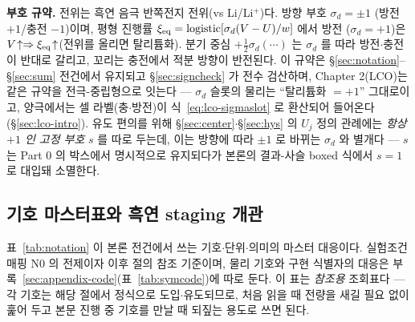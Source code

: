 \textbf{부호 규약.} 전위는 흑연 음극 반쪽전지 전위(vs Li/Li$^+$)다. 방향 부호 $\sigma_d=\pm1$
(방전 $+1$/충전 $-1$)이며, 평형 진행률 $\xi_{\mathrm{eq}}=\mathrm{logistic}[\sigma_d(V-U)/w]$ 에서 방전
($\sigma_d=+1$)은 $V\!\uparrow\Rightarrow\xi_{\mathrm{eq}}\!\uparrow$(전위를 올리면 탈리튬화). 분기 중심 $+\tfrac12\sigma_d(\cdots)$
는 $\sigma_d$ 를 따라 방전$\cdot$충전이 반대로 갈리고, 꼬리는 충전에서 적분 방향이 반전된다. 이 규약은 \S\ref{sec:notation}--\S\ref{sec:sum} 전건에서 유지되고 \S\ref{sec:signcheck} 가 전수 검산하며,
Chapter 2(LCO)는 같은 규약을 전극-중립형으로 잇는다 --- $\sigma_d$ 슬롯의 물리는 ``탈리튬화 $=+1$''
그대로이고, 양극에서는 셀 라벨(충$\cdot$방전)이 식~\eqref{eq:lco-sigmaslot} 로 환산되어 들어온다(\S\ref{sec:lco-intro}). 유도 편의를 위해 \S\ref{sec:center}$\cdot$\S\ref{sec:hys}
의 $U_j$ 정의 관례에는 \emph{항상 $+1$ 인 고정 부호} $s$ 를 따로 두는데, 이는 방향에 따라 $\pm1$ 로 바뀌는 $\sigma_d$ 와
별개다 --- $s$ 는 Part 0 의 박스에서 명시적으로 유지되다가 본론의 결과-사슬 boxed 식에서 $s{=}1$ 로 대입돼 소멸한다.

\subsection{기호 마스터표와 흑연 staging 개관}\label{sec:notation-table}
표~\ref{tab:notation} 이 본론 전건에서 쓰는 기호$\cdot$단위$\cdot$의미의 마스터 대응이다. 실험조건 매핑 $\mathrm N0$
의 전제이자 이후 절의 참조 기준이며, 물리 기호와 구현 식별자의 대응은 부록~\ref{sec:appendix-code}(표~\ref{tab:symcode})에 따로 둔다.
이 표는 \emph{참조용} 조회표다 --- 각 기호는 해당 절에서 정식으로 도입$\cdot$유도되므로, 처음 읽을 때
전량을 새길 필요 없이 훑어 두고 본문 진행 중 기호를 만날 때 되짚는 용도로 쓰면 된다.

